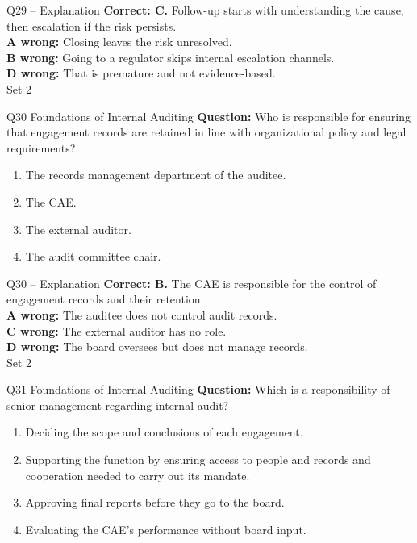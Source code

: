 \documentclass[aspectratio=169,10pt]{beamer}
\begin{document}
\begin{frame}[t]{Q29 -- Explanation}
	\footnotesize
	\textbf{Correct: C.} Follow-up starts with understanding the cause, then escalation if the risk persists. \\[5pt]
\textbf{A wrong:} Closing leaves the risk unresolved. \\[3pt]
\textbf{B wrong:} Going to a regulator skips internal escalation channels. \\[3pt]
\textbf{D wrong:} That is premature and not evidence-based. \\[3pt]
	\vfill {\tiny Set 2}
\end{frame}

\begin{frame}[t]{Q30 \hfill {\scriptsize Foundations of Internal Auditing}}
	\small
	\textbf{Question:} Who is responsible for ensuring that engagement records are retained in line with organizational policy and legal requirements?
	\begin{enumerate}[label=\Alph*.,itemsep=1pt,topsep=3pt]
			\item The records management department of the auditee.
			\item The CAE.
			\item The external auditor.
			\item The audit committee chair.
	\end{enumerate}
\end{frame}

\begin{frame}[t]{Q30 -- Explanation}
	\footnotesize
	\textbf{Correct: B.} The CAE is responsible for the control of engagement records and their retention. \\[5pt]
\textbf{A wrong:} The auditee does not control audit records. \\[3pt]
\textbf{C wrong:} The external auditor has no role. \\[3pt]
\textbf{D wrong:} The board oversees but does not manage records. \\[3pt]
	\vfill {\tiny Set 2}
\end{frame}

\begin{frame}[t]{Q31 \hfill {\scriptsize Foundations of Internal Auditing}}
	\small
	\textbf{Question:} Which is a responsibility of senior management regarding internal audit?
	\begin{enumerate}[label=\Alph*.,itemsep=1pt,topsep=3pt]
			\item Deciding the scope and conclusions of each engagement.
			\item Supporting the function by ensuring access to people and records and cooperation needed to carry out its mandate.
			\item Approving final reports before they go to the board.
			\item Evaluating the CAE's performance without board input.
	\end{enumerate}
\end{frame}
\end{document}
